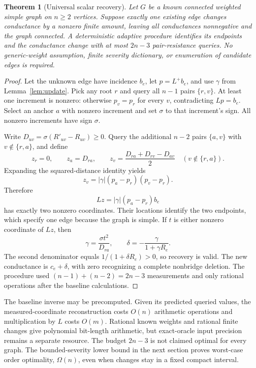 \documentclass[11pt,letterpaper]{article}
\newtheorem{theorem}{Theorem}
\begin{document}
\begin{theorem}[Universal scalar recovery]\label{thm:universal}
Let $G$ be a known connected weighted simple graph on $n\ge2$ vertices. Suppose exactly one existing edge changes conductance by a nonzero finite amount, leaving all conductances nonnegative and the graph connected. A deterministic adaptive procedure identifies its endpoints and the conductance change with at most $2n-3$ pair-resistance queries. No generic-weight assumption, finite severity dictionary, or enumeration of candidate edges is required.
\end{theorem}
\begin{proof}
Let the unknown edge have incidence $b_e$, let $p=L^+b_e$, and use $\gamma$ from Lemma~\ref{lem:update}. Pick any root $r$ and query all $n-1$ pairs $\{r,v\}$. At least one increment is nonzero: otherwise $p_v=p_r$ for every $v$, contradicting $Lp=b_e$. Select an anchor $a$ with nonzero increment and set $\sigma$ to that increment's sign. All nonzero increments have sign $\sigma$.

Write $D_{uv}=\sigma(R'_{uv}-R_{uv})\ge0$. Query the additional $n-2$ pairs $\{a,v\}$ with $v\notin\{r,a\}$, and define
\[
 z_r=0,\qquad z_a=D_{ra},\qquad
 z_v=\frac{D_{ra}+D_{rv}-D_{av}}2
 \quad(v\notin\{r,a\}).
\]
Expanding the squared-distance identity yields
\[
 z_v=|\gamma|(p_a-p_r)(p_v-p_r).
\]
Therefore
\[
 Lz=|\gamma|(p_a-p_r)b_e
\]
has exactly two nonzero coordinates. Their locations identify the two endpoints, which specify one edge because the graph is simple. If $t$ is either nonzero coordinate of $Lz$, then
\[
 \gamma=\frac{\sigma t^2}{D_{ra}},\qquad
 \delta=-\frac{\gamma}{1+\gamma R_e}.
\]
The second denominator equals $1/(1+\delta R_e)>0$, so recovery is valid. The new conductance is $c_e+\delta$, with zero recognizing a complete nonbridge deletion. The procedure used $(n-1)+(n-2)=2n-3$ measurements and only rational operations after the baseline calculations.
\end{proof}

The baseline inverse may be precomputed. Given its predicted queried values, the measured-coordinate reconstruction costs $O(n)$ arithmetic operations and multiplication by $L$ costs $O(m)$. Rational known weights and rational finite changes give polynomial bit-length arithmetic, but exact-oracle input precision remains a separate resource. The budget $2n-3$ is not claimed optimal for every graph. The bounded-severity lower bound in the next section proves worst-case order optimality, $\Omega(n)$, even when changes stay in a fixed compact interval.
\end{document}
